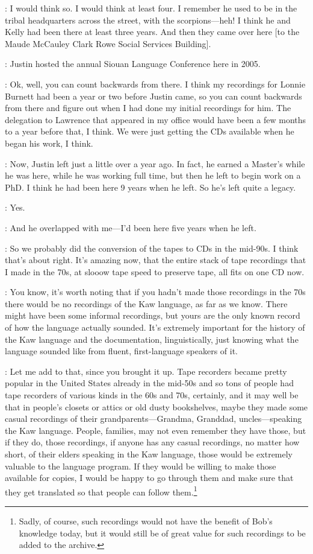 \documentclass[output=paper]{LSP/langsci}
\begin{document}
: I would think so. I would think at least four. I remember he used to be in the tribal headquarters across the street, with the scorpions---heh! I think he and Kelly had been there at least three years. And then they came over here [to the Maude McCauley Clark Rowe Social Services Building].

: Justin hosted the annual Siouan Language Conference here in 2005. 

: Ok, well, you can count backwards from there. I think my recordings for Lonnie Burnett had been a year or two before Justin came, so you can count backwards from there and figure out when I had done my initial recordings for him. The delegation to Lawrence that appeared in my office would have been a few months to a year before that, I think. We were just getting the CDs available when he began his work, I think.

: Now, Justin left just a little over a year ago. In fact, he earned a Master's while he was here, while he was working full time, but then he left to begin work on a PhD. I think he had been here 9 years when he left. So he's left quite a legacy.

: Yes.

: And he overlapped with me---I'd been here five years when he left.

: So we probably did the conversion of the tapes to CDs in the mid-90s. I think that's about right. It's amazing now, that the entire stack of tape recordings that I made in the 70s, at slooow tape speed to preserve tape, all fits on one CD now.

: You know, it's worth noting that if you hadn't made those recordings in the 70s there would be no recordings of the Kaw language, as far as we know. There might have been some informal recordings, but yours are the only known record of how the language actually sounded. It's extremely important for the history of the Kaw language and the documentation, linguistically, just knowing what the language sounded like from fluent, first-language speakers of it.

: Let me add to that, since you brought it up. Tape recorders became pretty popular in the United States already in the mid-50s and so tons of people had tape recorders of various kinds in the 60s and 70s, certainly, and it may well be that in people's closets or attics or old dusty bookshelves, maybe they made some casual recordings of their grandparents---Grandma, Granddad, uncles---speaking the Kaw language. People, families, may not even remember they have those, but if they do, those recordings, if anyone has any casual recordings, no matter how short, of their elders speaking in the Kaw language, those would be extremely valuable to the language program. If they would be willing to make those available for copies, I would be happy to go through them and make sure that they get translated so that people can follow them.\footnote{Sadly, of course, such recordings would not have the benefit of Bob's knowledge today, but it would still be of great value for such recordings to be added to the archive.}
\end{document}
